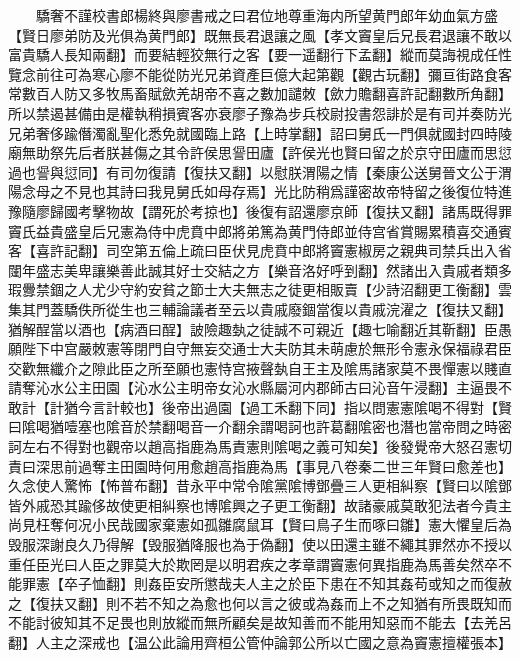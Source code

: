 　　驕奢不謹校書郎楊終與廖書戒之曰君位地尊重海内所望黄門郎年幼血氣方盛【賢日廖弟防及光俱為黄門郎】既無長君退讓之風【孝文竇皇后兄長君退讓不敢以富貴驕人長知兩翻】而要結輕狡無行之客【要一遥翻行下孟翻】縱而莫誨視成任性覽念前往可為寒心廖不能從防光兄弟資產巨億大起第觀【觀古玩翻】彌亘街路食客常數百人防又多牧馬畜賦歛羌胡帝不喜之數加譴敇【歛力贍翻喜許記翻數所角翻】所以禁遏甚備由是權執稍損賓客亦衰廖子豫為步兵校尉投書怨誹於是有司并奏防光兄弟奢侈踰僭濁亂聖化悉免就國臨上路【上時掌翻】詔曰舅氏一門俱就國封四時陵廟無助祭先后者朕甚傷之其令許侯思諐田廬【許侯光也賢曰留之於京守田廬而思愆過也諐與愆同】有司勿復請【復扶又翻】以慰朕渭陽之情【秦康公送舅晉文公于渭陽念母之不見也其詩曰我見舅氏如母存焉】光比防稍爲謹密故帝特留之後復位特進豫隨廖歸國考擊物故【謂死於考掠也】後復有詔還廖京師【復扶又翻】諸馬既得罪竇氏益貴盛皇后兄憲為侍中虎賁中郎將弟篤為黄門侍郎並侍宫省賞賜累積喜交通賓客【喜許記翻】司空第五倫上疏曰臣伏見虎賁中郎將竇憲椒房之親典司禁兵出入省闥年盛志美卑讓樂善此誠其好士交結之方【樂音洛好呼到翻】然諸出入貴戚者類多瑕釁禁錮之人尤少守約安貧之節士大夫無志之徒更相販賣【少詩沼翻更工衡翻】雲集其門蓋驕佚所從生也三輔論議者至云以貴戚廢錮當復以貴戚浣濯之【復扶又翻】猶解酲當以酒也【病酒曰酲】詖險趣埶之徒誠不可親近【趣七喻翻近其靳翻】臣愚願陛下中宫嚴敇憲等閉門自守無妄交通士大夫防其未萌慮於無形令憲永保福祿君臣交歡無纖介之隙此臣之所至願也憲恃宫掖聲埶自王主及隂馬諸家莫不畏憚憲以賤直請奪沁水公主田園【沁水公主明帝女沁水縣屬河内郡師古曰沁音午浸翻】主逼畏不敢計【計猶今言計較也】後帝出過園【過工禾翻下同】指以問憲憲隂喝不得對【賢曰隂喝猶噎塞也隂音於禁翻喝音一介翻余謂喝訶也許葛翻隂密也潛也當帝問之時密訶左右不得對也觀帝以趙高指鹿為馬責憲則隂喝之義可知矣】後發覺帝大怒召憲切責曰深思前過奪主田園時何用愈趙高指鹿為馬【事見八卷秦二世三年賢曰愈差也】久念使人驚怖【怖普布翻】昔永平中常令隂黨隂博鄧疊三人更相糾察【賢曰以隂鄧皆外戚恐其踰侈故使更相糾察也博隂興之子更工衡翻】故諸豪戚莫敢犯法者今貴主尚見枉奪何况小民哉國家棄憲如孤雛腐鼠耳【賢曰鳥子生而啄曰雛】憲大懼皇后為毁服深謝良久乃得解【毁服猶降服也為于偽翻】使以田還主雖不繩其罪然亦不授以重任臣光曰人臣之罪莫大於欺罔是以明君疾之孝章謂竇憲何異指鹿為馬善矣然卒不能罪憲【卒子恤翻】則姦臣安所懲哉夫人主之於臣下患在不知其姦苟或知之而復赦之【復扶又翻】則不若不知之為愈也何以言之彼或為姦而上不之知猶有所畏既知而不能討彼知其不足畏也則放縱而無所顧矣是故知善而不能用知惡而不能去【去羌呂翻】人主之深戒也【温公此論用齊桓公管仲論郭公所以亡國之意為竇憲擅權張本】

